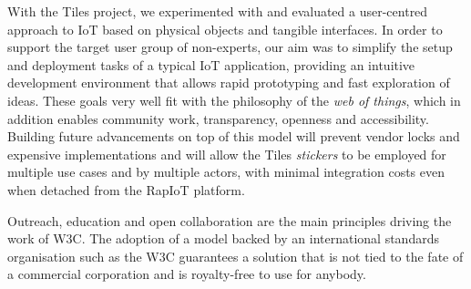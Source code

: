 With the Tiles project, we experimented with and evaluated a user-centred approach to IoT based on physical objects and tangible interfaces. In order to support the target user group of non-experts, our aim was to simplify the setup and deployment tasks of a typical IoT application, providing an intuitive development environment that allows rapid prototyping and fast exploration of ideas. These goals very well fit with the philosophy of the \textit{web of things}, which in addition enables community work, transparency, openness and accessibility. Building future advancements on top of this model will prevent vendor locks and expensive implementations and will allow the Tiles \textit{stickers} to be employed for multiple use cases and by multiple actors, with minimal integration costs even when detached from the RapIoT platform.

Outreach, education and open collaboration are the main principles driving the work of W3C. The adoption of a model backed by an international standards organisation such as the W3C guarantees a solution that is not tied to the fate of a commercial corporation and is royalty-free to use for anybody.